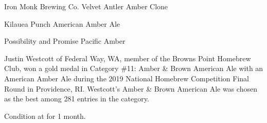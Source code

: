 \begin{recipie}{Iron Monk Brewing Co. Velvet Antler Amber Clone}
\begin{recipie}{Kilauea Punch American Amber Ale}
\begin{ingredientsblock}
\begin{hops}
\end{hops}

\begin{yeasts}
\end{yeasts}

\end{ingredientsblock}

\end{recipie}

\begin{recipie}{Possibility and Promise Pacific Amber}

\begin{aboutblock}
Justin Westcott of Federal Way, WA, member of the Browns Point Homebrew Club, won
a gold medal in Category \#11: Amber \& Brown American Ale with an American Amber
Ale during the 2019 National Homebrew Competition Final Round in Providence, RI.
Westcott's Amber \& Brown American Ale was chosen as the best among 281 entries in
the category. \sourceaha
\end{aboutblock}


\begin{methodandtiming}
 
\begin{mashsteps}
\end{mashsteps}

\begin{fermentationsteps}
\end{fermentationsteps}

\begin{directions}
Condition at  for 1 month.
\end{directions}

\end{methodandtiming}


\end{recipie}
\end{recipie}
